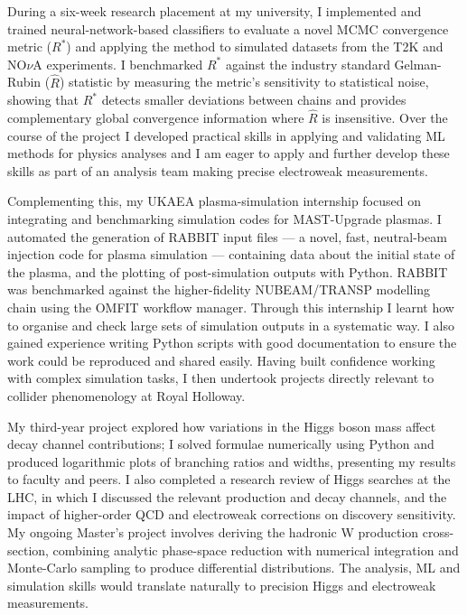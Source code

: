 \documentclass[11pt]{report}
\begin{document}
\begin{titlepage}
		During a six-week research placement at my university, I implemented and trained neural-network-based classifiers to evaluate a novel MCMC convergence metric ($R^*$) and applying the method to simulated datasets from the T2K and NO$\nu$A experiments. I benchmarked $R^*$ against the industry standard Gelman-Rubin ($\hat{R}$) statistic by measuring the metric’s sensitivity to statistical noise, showing that $R^*$ detects smaller deviations between chains and provides complementary global convergence information where  $\hat{R}$ is insensitive. Over the course of the project I developed practical skills in applying and validating ML methods for physics analyses and I am eager to apply and further develop these skills as part of an analysis team making precise electroweak measurements.\\
		\vspace{0.7em}
		
		Complementing this, my UKAEA plasma-simulation internship focused on integrating and benchmarking simulation codes for MAST-Upgrade plasmas. I automated the generation of RABBIT input files --- a novel, fast, neutral-beam injection code for plasma simulation --- containing data about the initial state of the plasma, and the plotting of post-simulation outputs with Python. RABBIT was benchmarked against the higher-fidelity NUBEAM/TRANSP modelling chain using the OMFIT workflow manager. Through this internship I learnt how to organise and check large sets of simulation outputs in a systematic way. I also gained experience writing Python scripts with good documentation to ensure the work could be reproduced and shared easily. Having built confidence working with complex simulation tasks, I then undertook projects directly relevant to collider phenomenology at Royal Holloway.\\
		\vspace{0.7em}
		
		My third-year project explored how variations in the Higgs boson mass affect decay channel contributions; I solved formulae numerically using Python and produced logarithmic plots of branching ratios and widths, presenting my results to faculty and peers. I also completed a research review of Higgs searches at the LHC, in which I discussed the relevant production and decay channels, and the impact of higher-order QCD and electroweak corrections on discovery sensitivity. My ongoing Master’s project involves deriving the hadronic W production cross-section, combining analytic phase-space reduction with numerical integration and Monte-Carlo sampling to produce differential distributions. The analysis, ML and simulation skills would translate naturally to precision Higgs and electroweak measurements.\\
		\vspace{0.7em}
		

\end{titlepage}
\end{document}
